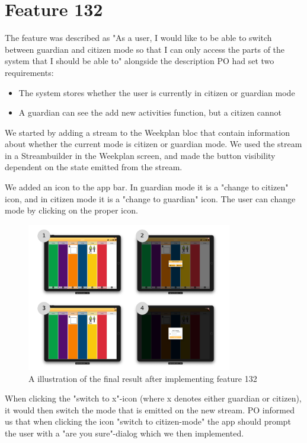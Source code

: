 \section{Feature 132}
The feature was described as "As a user, I would like to be able to switch between guardian and citizen mode so that I can only access the parts of the system that I should be able to" alongside the description \gls{PO} had set two requirements:

\begin{itemize}
  \item The system stores whether the user is currently in citizen or guardian mode
  \item A guardian can see the add new activities function, but a citizen cannot
\end{itemize}

We started by adding a stream to the Weekplan \gls{bloc} that contain information about whether the current mode is citizen or guardian mode. We used the stream in a Streambuilder in the Weekplan screen, and made the button visibility dependent on the state emitted from the stream.

We added an icon to the app bar. In guardian mode it is a "change to citizen" icon, and in citizen mode it is a "change to guardian" icon. The user can change mode by clicking on the proper icon.

\begin{figure}[h]
    \centering
    \includegraphics[width=0.8\textwidth]{figures/feature_132.pdf}
    \caption{A illustration of the final result after implementing feature 132}
    \label{fig:feature132}
\end{figure}

When clicking the "switch to x"-icon (where x denotes either guardian or citizen), it would then switch the mode that is emitted on the new stream. \gls{PO} informed us that when clicking the icon "switch to citizen-mode" the app should prompt the user with a "are you sure"-dialog which we then implemented.

